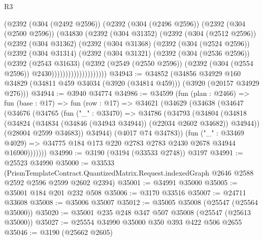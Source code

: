 \begin{lexlean}{R3}
\begin{coremodule}
              (@2392
                (@304 (@2492 @2596))
                (@2392
                  (@304 (@2496 @2596))
                  (@2392
                    (@304 (@2500 @2596))
                    (@34830
                      (@2392
                        (@304 @31352)
                        (@2392
                          (@304 (@2512 @2596))
                          (@2392
                            (@304 @31362)
                            (@2392
                              (@304 @31368)
                              (@2392
                                (@304 (@2524 @2596))
                                (@2392
                                  (@304 @31314)
                                  (@2392
                                    (@304 @31321)
                                    (@2392
                                      (@304 (@2536 @2596))
                                      (@2392
                                        (@2543 @31633)
                                        (@2392
                                          (@2549 (@2550 @2596))
                                          (@2392 (@304 (@2554 @2596)) @2430))))))))))))))))))))
@34943 := @34852
    (@34856
      @34929
      @160
      @34829
      (@34811 @459 @34034 (@3920 (@34814 @459)))
      (@3920 (@20157 @34929 @276)))
@34944 := @3940 @34774
@34986 := @34599
    (fun (plan : @2466) =>
    fun (base : @17) =>
    fun (row : @17) =>
    @34621
      (@34629
        (@34638
          (@34647
            (@34676
              (@34765
                (fun ("_" : @33470) =>
                @34786
                  (@34793
                    (@34804
                      (@34818
                        (@34824 (@34834 (@34846 (@34943 @34944)) (@22034 @2602 @34682)) @34944))
                      (@28004 @2599 @34683))
                    @34944)
                  (@4017 @74 @34783))
                (fun ("_" : @33469 @4029) =>
                @34775 @184 @173 @220 @2783 @2783 @2430 @2678 @34944 @16900)))))))
@34990 := @3190 (@3194 (@33533 @2748)) @3197
@34991 := @25523 @34990
@35000 := @33533
    (PrismTemplateContract.QuantizedMatrix.Request.indexedGraph
      @2646
      @2588
      @2592
      @2596
      @2599
      @2602
      @2394)
@35001 := @34991 @35000
@35005 := @35001 @184 @201 @232 @508
@35006 := @3170 @33516
@35007 := @24711 @33608
@35008 := @35006 @35007
@35012 := @35005 @35008 (@25547 (@25564 @35000))
@35020 := @35001 @235 @248 @347 @507 @35008 (@25547 (@25613 @35000))
@35027 := @25554 @34990 @35000 @350 @393 @422 @506 @2655
@35046 := @3190
    (@25662 @2605)

\end{coremodule}
\end{lexlean}
